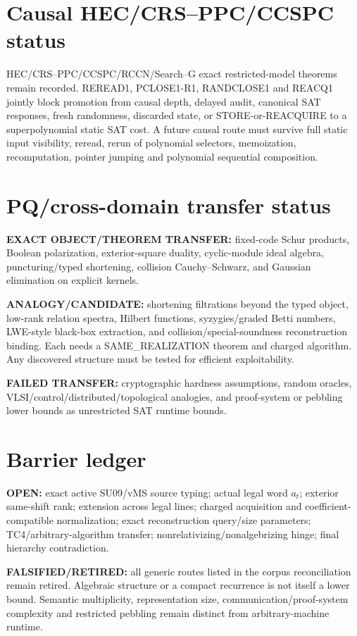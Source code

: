 \documentclass[11pt]{article}
\begin{document}
\section*{Causal HEC/CRS--PPC/CCSPC status}
HEC/CRS--PPC/CCSPC/RCCN/Search--G exact restricted-model theorems remain recorded. REREAD1, PCLOSE1-R1, RANDCLOSE1 and REACQ1 jointly block promotion from causal depth, delayed audit, canonical SAT responses, fresh randomness, discarded state, or STORE-or-REACQUIRE to a superpolynomial static SAT cost. A future causal route must survive full static input visibility, reread, rerun of polynomial selectors, memoization, recomputation, pointer jumping and polynomial sequential composition.

\section*{PQ/cross-domain transfer status}
\textbf{EXACT OBJECT/THEOREM TRANSFER:} fixed-code Schur products, Boolean polarization, exterior-square duality, cyclic-module ideal algebra, puncturing/typed shortening, collision Cauchy--Schwarz, and Gaussian elimination on explicit kernels.

\textbf{ANALOGY/CANDIDATE:} shortening filtrations beyond the typed object, low-rank relation spectra, Hilbert functions, syzygies/graded Betti numbers, LWE-style black-box extraction, and collision/special-soundness reconstruction binding. Each needs a SAME\_REALIZATION theorem and charged algorithm. Any discovered structure must be tested for efficient exploitability.

\textbf{FAILED TRANSFER:} cryptographic hardness assumptions, random oracles, VLSI/control/distributed/topological analogies, and proof-system or pebbling lower bounds as unrestricted SAT runtime bounds.

\section*{Barrier ledger}
\textbf{OPEN:} exact active SU09/vMS source typing; actual legal word \(a_t\); exterior same-shift rank; extension across legal lines; charged acquisition and coefficient-compatible normalization; exact reconstruction query/size parameters; TC4/arbitrary-algorithm transfer; nonrelativizing/nonalgebrizing hinge; final hierarchy contradiction.

\textbf{FALSIFIED/RETIRED:} all generic routes listed in the corpus reconciliation remain retired. Algebraic structure or a compact recurrence is not itself a lower bound. Semantic multiplicity, representation size, communication/proof-system complexity and restricted pebbling remain distinct from arbitrary-machine runtime.
\end{document}
